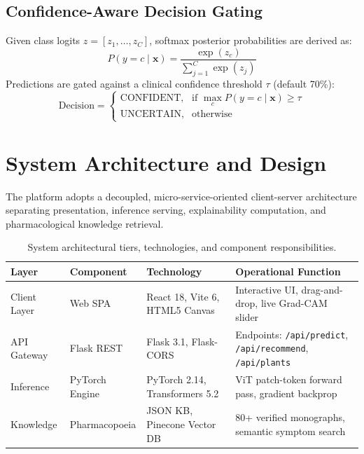 \documentclass[sn-mathphys,Numbered]{sn-jnl}%
\begin{document}
\subsection{Confidence-Aware Decision Gating}
Given class logits $z = [z_1, \dots, z_C]$, softmax posterior probabilities are derived as:
\begin{equation}
P(y = c \mid \mathbf{x}) = \frac{\exp(z_c)}{\sum_{j=1}^C \exp(z_j)}
\end{equation}
Predictions are gated against a clinical confidence threshold $\tau$ (default 70\%):
\begin{equation}
\text{Decision} = 
\begin{cases} 
\text{CONFIDENT}, & \text{if } \max_c P(y = c \mid \mathbf{x}) \ge \tau \\ 
\text{UNCERTAIN}, & \text{otherwise} 
\end{cases}
\end{equation}

\section{System Architecture and Design}\label{sec5}
The platform adopts a decoupled, micro-service-oriented client-server architecture separating presentation, inference serving, explainability computation, and pharmacological knowledge retrieval.

\begin{table}[h]
\caption{System architectural tiers, technologies, and component responsibilities.}\label{tab:arch}
\begin{tabular*}{\textwidth}{@{\extracolsep\fill}llll@{\extracolsep\fill}}
\toprule
Layer & Component & Technology & Operational Function \\
\midrule
Client Layer & Web SPA & React 18, Vite 6, HTML5 Canvas & Interactive UI, drag-and-drop, live Grad-CAM slider \\
API Gateway & Flask REST & Flask 3.1, Flask-CORS & Endpoints: \texttt{/api/predict}, \texttt{/api/recommend}, \texttt{/api/plants} \\
Inference & PyTorch Engine & PyTorch 2.14, Transformers 5.2 & ViT patch-token forward pass, gradient backprop \\
Knowledge & Pharmacopoeia & JSON KB, Pinecone Vector DB & 80+ verified monographs, semantic symptom search \\
\bottomrule
\end{tabular*}
\end{table}
\end{document}
